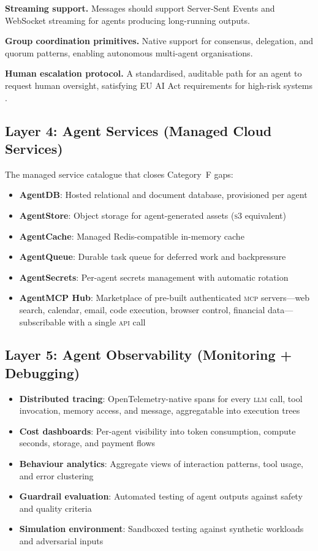 \documentclass[twoside,11pt]{article}
\begin{document}
\textbf{Streaming support.} Messages should support Server-Sent Events and
WebSocket streaming for agents producing long-running outputs.

\textbf{Group coordination primitives.} Native support for consensus,
delegation, and quorum patterns, enabling autonomous multi-agent organisations.

\textbf{Human escalation protocol.} A standardised, auditable path for an
agent to request human oversight, satisfying EU AI Act requirements for
high-risk systems \citep{owasp2025agentic}.

\subsection{Layer 4: Agent Services (Managed Cloud Services)}
\label{subsec:layer4}

The managed service catalogue that closes Category~F gaps:

\begin{itemize}[leftmargin=*]
\item \textbf{AgentDB}: Hosted relational and document database, provisioned
per agent
\item \textbf{AgentStore}: Object storage for agent-generated assets
(\textsc{s3} equivalent)
\item \textbf{AgentCache}: Managed Redis-compatible in-memory cache
\item \textbf{AgentQueue}: Durable task queue for deferred work and backpressure
\item \textbf{AgentSecrets}: Per-agent secrets management with automatic
rotation
\item \textbf{AgentMCP Hub}: Marketplace of pre-built authenticated
\textsc{mcp} servers---web search, calendar, email, code execution, browser
control, financial data---subscribable with a single \textsc{api} call
\end{itemize}

\subsection{Layer 5: Agent Observability (Monitoring + Debugging)}
\label{subsec:layer5}

\begin{itemize}[leftmargin=*]
\item \textbf{Distributed tracing}: OpenTelemetry-native spans for every
\textsc{llm} call, tool invocation, memory access, and message, aggregatable
into execution trees
\item \textbf{Cost dashboards}: Per-agent visibility into token consumption,
compute seconds, storage, and payment flows
\item \textbf{Behaviour analytics}: Aggregate views of interaction patterns,
tool usage, and error clustering
\item \textbf{Guardrail evaluation}: Automated testing of agent outputs against
safety and quality criteria
\item \textbf{Simulation environment}: Sandboxed testing against synthetic
workloads and adversarial inputs
\end{itemize}
\end{document}
